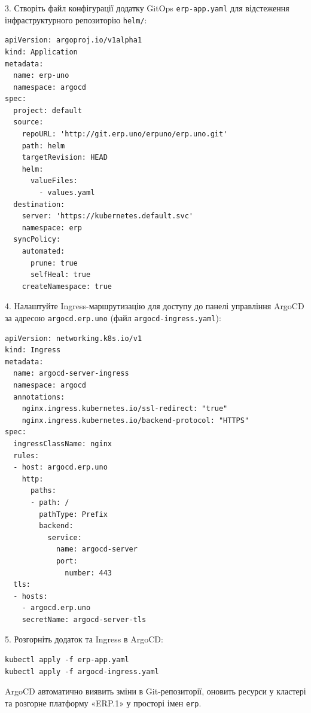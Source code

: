 3. Створіть файл конфігурації додатку GitOps \texttt{erp-app.yaml} для відстеження інфраструктурного репозиторію \texttt{helm/}:
\begin{lstlisting}
apiVersion: argoproj.io/v1alpha1
kind: Application
metadata:
  name: erp-uno
  namespace: argocd
spec:
  project: default
  source:
    repoURL: 'http://git.erp.uno/erpuno/erp.uno.git'
    path: helm
    targetRevision: HEAD
    helm:
      valueFiles:
        - values.yaml
  destination:
    server: 'https://kubernetes.default.svc'
    namespace: erp
  syncPolicy:
    automated:
      prune: true
      selfHeal: true
    createNamespace: true
\end{lstlisting}

4. Налаштуйте Ingress-маршрутизацію для доступу до панелі управління ArgoCD за адресою \texttt{argocd.erp.uno} (файл \texttt{argocd-ingress.yaml}):
\begin{lstlisting}
apiVersion: networking.k8s.io/v1
kind: Ingress
metadata:
  name: argocd-server-ingress
  namespace: argocd
  annotations:
    nginx.ingress.kubernetes.io/ssl-redirect: "true"
    nginx.ingress.kubernetes.io/backend-protocol: "HTTPS"
spec:
  ingressClassName: nginx
  rules:
  - host: argocd.erp.uno
    http:
      paths:
      - path: /
        pathType: Prefix
        backend:
          service:
            name: argocd-server
            port:
              number: 443
  tls:
  - hosts:
    - argocd.erp.uno
    secretName: argocd-server-tls
\end{lstlisting}

5. Розгорніть додаток та Ingress в ArgoCD:
\begin{lstlisting}
kubectl apply -f erp-app.yaml
kubectl apply -f argocd-ingress.yaml
\end{lstlisting}

ArgoCD автоматично виявить зміни в Git-репозиторії, оновить ресурси у кластері та розгорне платформу «ERP.1» у просторі імен \texttt{erp}.

